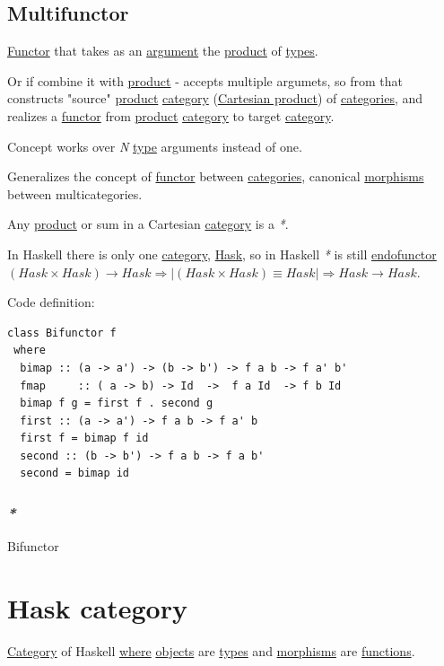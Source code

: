 \documentclass[a4paper,14pt,oneside]{book}
\begin{document}
\subsection{\label{org0bca855}Multifunctor}
\label{sec:org5f134ec}
\hyperref[org878310f]{Functor} that takes as an \hyperref[org60a0fa7]{argument} the \hyperref[org57cbda9]{product} of \hyperref[org071cf6a]{types}.

Or if combine it with \hyperref[org57cbda9]{product} - accepts multiple argumets, so from that constructs "source" \hyperref[org57cbda9]{product} \hyperref[org77f032a]{category} (\hyperref[org9ca1cf2]{Cartesian product}) of \hyperref[orga38a60d]{categories}, and realizes a \hyperref[org878310f]{functor} from \hyperref[org57cbda9]{product} \hyperref[org77f032a]{category} to target \hyperref[org77f032a]{category}.

Concept works over \emph{N} \hyperref[org6e832de]{type} arguments instead of one.

Generalizes the concept of \hyperref[org878310f]{functor} between \hyperref[orga38a60d]{categories}, canonical \hyperref[orgd994d44]{morphisms} between multicategories.

Any \hyperref[org57cbda9]{product} or sum in a Cartesian \hyperref[org77f032a]{category} is a \emph{*}.

In Haskell there is only one \hyperref[org77f032a]{category}, \hyperref[orge9ae2dc]{Hask}, so in Haskell \emph{*} is still \hyperref[org51b87cf]{endofunctor} \((Hask \times Hask) \rightarrow Hask \Rightarrow | (Hask \times Hask) \equiv Hask | \Rightarrow Hask \rightarrow Hask\).

Code definition:
\begin{verbatim}
class Bifunctor f
 where
  bimap :: (a -> a') -> (b -> b') -> f a b -> f a' b'
  fmap     :: ( a -> b) -> Id  ->  f a Id  -> f b Id
  bimap f g = first f . second g
  first :: (a -> a') -> f a b -> f a' b
  first f = bimap f id
  second :: (b -> b') -> f a b -> f a b'
  second = bimap id
\end{verbatim}

\subsubsection{\emph{*}}
\label{sec:org7543c4e}
\label{org5c63dbf}Bifunctor

\section{\label{orgd007184}Hask category}
\label{sec:org7a05570}
\hyperref[org77f032a]{Category} of Haskell \hyperref[org2d15749]{where} \hyperref[orgcb7c876]{objects} are \hyperref[org071cf6a]{types} and \hyperref[orgd994d44]{morphisms} are \hyperref[org6776c75]{functions}.
\end{document}
